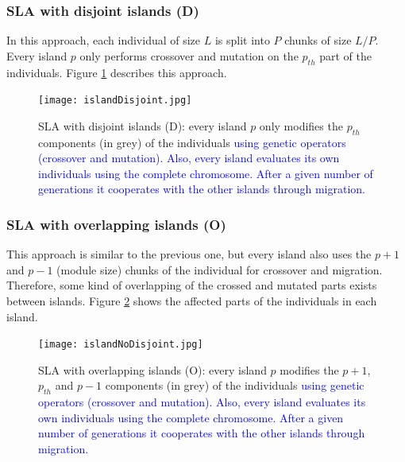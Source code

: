 \documentclass[preprint]{elsarticle}
\begin{document}
\subsubsection{SLA with disjoint islands (D)} 
In this approach, each individual of size $L$ is split into $P$ chunks
of size $L/P$. Every island $p$ only performs crossover and mutation
on the $p_{th}$ part of the individuals. Figure \ref{fig:disjoint}
describes this approach.
%
\begin{figure}[h!tb]
\centering
\texttt{[image: islandDisjoint.jpg]}
\caption{SLA with disjoint islands (D): every island $p$ only modifies the $p_{th}$ components (in grey) of the individuals \textcolor{blue}{using genetic operators (crossover and mutation). Also, every island evaluates its own individuals using the complete chromosome. After a given number of generations it cooperates with the other islands through migration.}}
\label{fig:disjoint}
\end{figure}

\subsubsection{SLA with overlapping islands (O)}
This approach is similar to the previous one, but every island also uses the $p+1$ and $p-1$ (module size) chunks of the individual for crossover and migration. Therefore, some kind of overlapping of the crossed and mutated parts exists between islands. Figure \ref{fig:overlapping} shows the affected parts of the individuals in
each island. 

\begin{figure}[h!tb]
\centering
\texttt{[image: islandNoDisjoint.jpg]}
\caption{SLA with overlapping islands (O): every island $p$ modifies the  $p+1$,
  $p_{th}$ and $p-1$  components (in grey) of the individuals \textcolor{blue}{using genetic operators (crossover and mutation). Also, every island evaluates its own individuals using the complete chromosome. After a given number of generations it cooperates with the other islands through migration.}}
  \label{fig:overlapping}
\end{figure}
\end{document}
